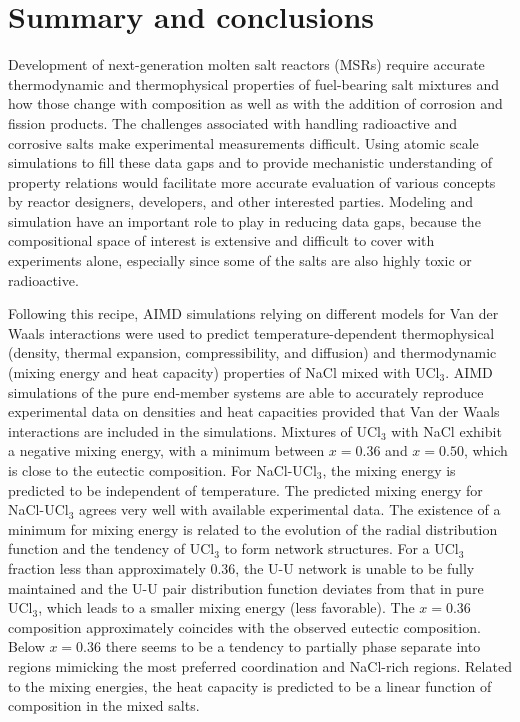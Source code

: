 \documentclass[preprint,3p,10pt,onecolumn,number,sort&compress]{elsarticle}
\begin{document}
\FloatBarrier

\section{Summary and conclusions}
\label{sec:conclusions}
Development of next-generation molten salt reactors (MSRs) require accurate thermodynamic and thermophysical properties of fuel-bearing salt mixtures and how those change with composition as well as with the addition of corrosion and fission products. The challenges associated with handling radioactive and corrosive salts make experimental measurements difficult. Using atomic scale simulations to fill these data gaps and to provide mechanistic understanding of property relations would facilitate more accurate evaluation of various concepts by reactor designers, developers, and other interested parties. Modeling and simulation have an important role to play in reducing data gaps, because the compositional space of interest is extensive and difficult to cover with experiments alone, especially since some of the salts are also highly toxic or radioactive. 

Following this recipe, AIMD simulations relying on different models for Van der Waals interactions were used to predict temperature-dependent thermophysical (density, thermal expansion, compressibility, and diffusion) and thermodynamic (mixing energy and heat capacity) properties of NaCl mixed with UCl$_3$. AIMD simulations of the pure end-member systems are able to accurately reproduce experimental data on densities and heat capacities provided that Van der Waals interactions are included in the simulations. 
Mixtures of UCl$_3$ with NaCl exhibit a negative mixing energy, with a minimum between $x=0.36$ and $x=0.50$, which is close to the eutectic composition. 
For NaCl-UCl$_3$, the mixing energy is predicted to be independent of temperature. The predicted mixing energy for NaCl-UCl$_3$ agrees very well with available experimental data. 
The existence of a minimum for mixing energy is related to the evolution of the radial distribution function and the tendency of UCl$_3$ to form network structures.
For a UCl$_3$ fraction less than approximately 0.36, the U-U network is unable to be fully maintained and the U-U pair distribution function deviates from that in pure UCl$_3$, which leads to a smaller mixing energy (less favorable). The $x=0.36$ composition approximately coincides with the observed eutectic composition. Below $x=0.36$ there seems to be a tendency to partially phase separate into regions mimicking the most preferred coordination and NaCl-rich regions. Related to the mixing energies, the heat capacity is predicted to be a linear function of composition in the mixed salts.
\end{document}
